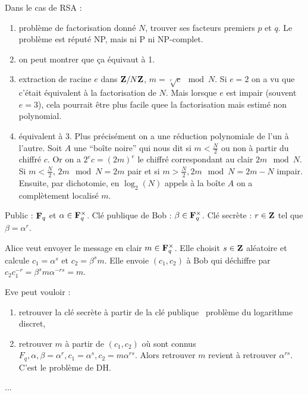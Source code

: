 \begin{ex}
		Dans le cas de RSA :
		\begin{enumerate}[1 \textrightarrow\ ]
			\item problème de factorisation donné $N$, trouver ses facteurs premiers $p$ et $q$.
				Le problème est réputé NP, mais ni P ni NP-complet.
			\item on peut montrer que ça équivaut à 1.
			\item extraction de racine $e$ dans $\mathbf{Z} / N\mathbf{Z}$, $m = \sqrt[e]{c} \mod{N}$.
				Si $e = 2$ on a vu que c'était équivalent à la factorisation de $N$.
				Mais lorsque $e$ est impair (souvent $e = 3$), cela pourrait être plus facile quee la factorisation mais estimé non polynomial.
			\item équivalent à 3.
				Plus précisément on a une réduction polynomiale de l'un à l'autre.
				Soit $A$ une “boîte noire” qui nous dit si $m < \frac{N}{2}$ ou non à partir du chiffré $c$.
				Or on a $2^e c = (2m)^e$ le chiffré correspondant au clair $2m \mod{N}$.
				Si $m < \frac{N}{2}$, $2m \mod{N} = 2m$ pair et si $m > \frac{N}{2}, 2m \mod{N} = 2m - N$ impair.
				Ensuite, par dichotomie, en $\log_2(N)$ appels à la boîte $A$ on a complètement localisé $m$.
		\end{enumerate}
	\end{ex}
	
	\begin{ex}
		Public : $\mathbf{F}_q$ et $\alpha \in \mathbf{F}_q^\times$.
		Clé publique de Bob : $\beta \in \mathbf{F}_q^\times$.
		Clé secrète : $r \in \mathbf{Z}$ tel que $\beta = \alpha^r$.
		
		Alice veut envoyer le message en clair $m \in \mathbf{F}_q^\times$.
		Elle choisit $s \in \mathbf{Z}$ aléatoire et calcule $c_1 = \alpha^s$ et $c_2 = \beta^s m$.
		Elle envoie $(c_1,c_2)$ à Bob qui déchiffre par $c_2 c_1^{-r} = \beta^s m \alpha^{-rs} = m$.
		
		Eve peut vouloir :
		\begin{enumerate}[1.]
			\item retrouver la clé secrète à partir de la clé publique \textrightarrow\ problème du logarithme discret,
			\item retrouver $m$ à partir de $(c_1,c_2)$ où sont connus $F_q, \alpha, \beta = \alpha^r, c_1 = \alpha^s, c_2 = m \alpha^{rs}$.
				Alors retrouver $m$ revient à retrouver $\alpha^{rs}$.
				C'est le problème de DH.
		\end{enumerate}
		...
	\end{ex}